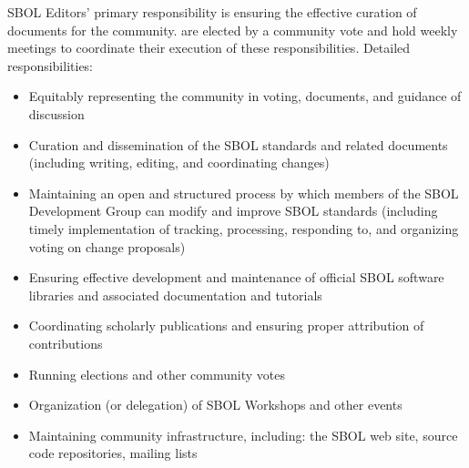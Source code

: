 \documentclass[11pt,a4paper,sans]{moderncv}        %
\begin{document}
{}{}
{SBOL Editors' primary responsibility is ensuring the effective curation of documents for the community.  are elected by a community vote and hold weekly meetings to coordinate their execution of these responsibilities.
	\newline{}
	Detailed responsibilities:
	\begin{itemize}
		\item Equitably representing the community in voting, documents, and guidance of discussion
		\item Curation and dissemination of the SBOL standards and related documents (including writing, editing, and coordinating changes)
		\item Maintaining an open and structured process by which members of the SBOL Development Group can modify and improve SBOL standards (including timely implementation of tracking, processing, responding to, and organizing voting on change proposals)
		\item Ensuring effective development and maintenance of official SBOL software libraries and associated documentation and tutorials
		\item Coordinating scholarly publications and ensuring proper attribution of contributions
		\item Running elections and other community votes
		\item Organization (or delegation) of SBOL Workshops and other events
		\item Maintaining community infrastructure, including: the SBOL web site, source code repositories, mailing lists
\end{itemize}}


%
%
\end{document}
